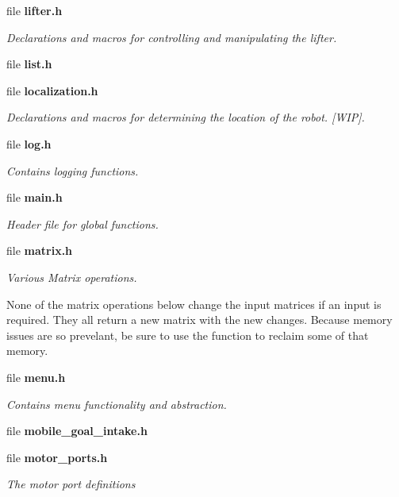 \begin{DoxyCompactItemize}
file \textbf{ lifter.\+h}
\begin{DoxyCompactList}\small\item\em Declarations and macros for controlling and manipulating the lifter. \end{DoxyCompactList}\item 
file \textbf{ list.\+h}
\item 
file \textbf{ localization.\+h}
\begin{DoxyCompactList}\small\item\em Declarations and macros for determining the location of the robot. [W\+IP]. \end{DoxyCompactList}\item 
file \textbf{ log.\+h}
\begin{DoxyCompactList}\small\item\em Contains logging functions. \end{DoxyCompactList}\item 
file \textbf{ main.\+h}
\begin{DoxyCompactList}\small\item\em Header file for global functions. \end{DoxyCompactList}\item 
file \textbf{ matrix.\+h}
\begin{DoxyCompactList}\small\item\em Various Matrix operations.

None of the matrix operations below change the input matrices if an input is required. They all return a new matrix with the new changes. Because memory issues are so prevelant, be sure to use the  function to reclaim some of that memory. \end{DoxyCompactList}\item 
file \textbf{ menu.\+h}
\begin{DoxyCompactList}\small\item\em Contains menu functionality and abstraction. \end{DoxyCompactList}\item 
file \textbf{ mobile\+\_\+goal\+\_\+intake.\+h}
\item 
file \textbf{ motor\+\_\+ports.\+h}
\begin{DoxyCompactList}\small\item\em The motor port definitions


\end{DoxyCompactList}
\end{DoxyCompactItemize}
